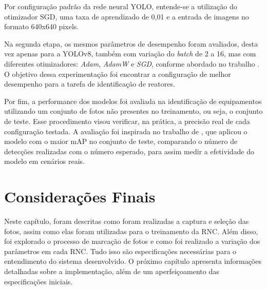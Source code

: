 Por configuração padrão da rede neural YOLO, entende-se a utilização do otimizador SGD, uma taxa de aprendizado de 0,01 e a entrada de imagens no formato 640x640 pixels.

Na segunda etapa, os mesmos parâmetros de desempenho foram avaliados, desta vez apenas para a YOLOv8, também com variação do \textit{batch} de 2 a 16, mas com diferentes otimizadores: \textit{Adam}, \textit{AdamW} e \textit{SGD}, conforme abordado no trabalho \cite{gonzaga2023identificaccao}. O objetivo dessa experimentação foi encontrar a configuração de melhor desempenho para a tarefa de identificação de reatores.

Por fim, a performance dos modelos foi avaliada na identificação de equipamentos utilizando um conjunto de fotos não presentes no treinamento, ou seja, o conjunto de teste. Esse procedimento visou verificar, na prática, a precisão real de cada configuração testada. A avaliação foi inspirada no trabalho de , que aplicou o modelo com o maior mAP no conjunto de teste, comparando o número de detecções realizadas com o número esperado, para assim medir a efetividade do modelo em cenários reais.

\section{Considerações Finais}

Neste capítulo, foram descritas como foram realizadas a captura e seleção das fotos, assim como elas foram utilizadas para o treinamento da RNC. Além disso, foi explorado o processo de marcação de fotos e como foi realizado a variação dos parâmetros em cada RNC. Tudo isso são especificações necessárias para o entendimento do sistema desenvolvido. O próximo capítulo apresenta informações detalhadas sobre a implementação, além de um aperfeiçoamento das especificações iniciais.






